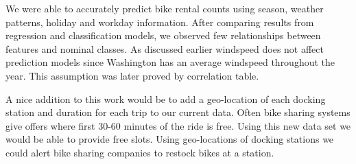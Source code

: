 \documentclass[12pt]{article}
\newcommand{\bibfile}{GroupProject}
\begin{document}

We were able to accurately predict bike rental counts using season, weather
patterns, holiday and workday information.  After comparing results from
regression and classification models, we observed few relationships between
features and nominal classes. As discussed earlier windspeed does not affect
prediction models since Washington has an average windspeed throughout the
year. This assumption was later proved by correlation table.



A nice addition to this work would be to add a geo-location of each docking
station and duration for each trip to our current data. Often bike sharing
systems give offers where first 30-60 minutes of the ride is free.  Using this
new data set we would be able to provide free slots.  Using geo-locations
of docking stations we could alert bike sharing companies to restock bikes at a
station.



\end{document}
